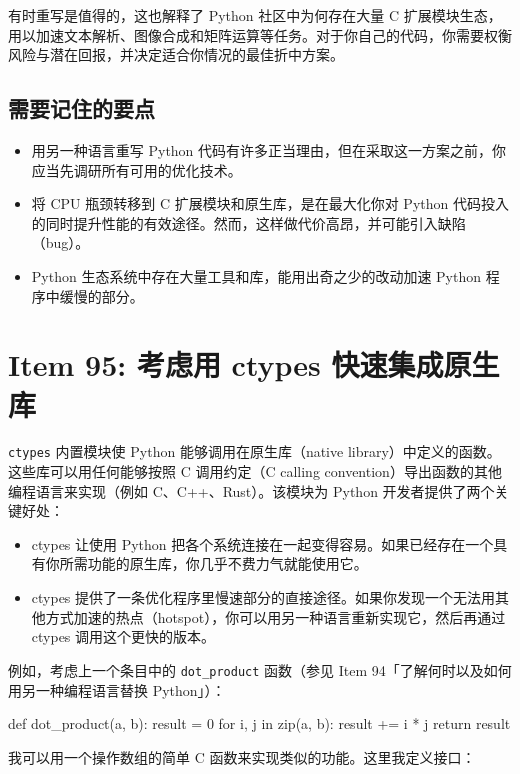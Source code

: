 有时重写是值得的，这也解释了 Python 社区中为何存在大量 C 扩展模块生态，用以加速文本解析、图像合成和矩阵运算等任务。对于你自己的代码，你需要权衡风险与潜在回报，并决定适合你情况的最佳折中方案。

\subsection{需要记住的要点}

\begin{itemize}
\item 用另一种语言重写 Python 代码有许多正当理由，但在采取这一方案之前，你应当先调研所有可用的优化技术。
\item 将 CPU 瓶颈转移到 C 扩展模块和原生库，是在最大化你对 Python 代码投入的同时提升性能的有效途径。然而，这样做代价高昂，并可能引入缺陷（bug）。
\item Python 生态系统中存在大量工具和库，能用出奇之少的改动加速 Python 程序中缓慢的部分。
\end{itemize}

\section{Item 95: 考虑用 ctypes 快速集成原生库}

\texttt{ctypes} 内置模块使 Python 能够调用在原生库（native library）中定义的函数。这些库可以用任何能够按照 C 调用约定（C calling convention）导出函数的其他编程语言来实现（例如 C、C++、Rust）。该模块为 Python 开发者提供了两个关键好处：

\begin{itemize}
\item ctypes 让使用 Python 把各个系统连接在一起变得容易。如果已经存在一个具有你所需功能的原生库，你几乎不费力气就能使用它。
\item ctypes 提供了一条优化程序里慢速部分的直接途径。如果你发现一个无法用其他方式加速的热点（hotspot），你可以用另一种语言重新实现它，然后再通过 ctypes 调用这个更快的版本。
\end{itemize}

例如，考虑上一个条目中的 \texttt{dot\_product} 函数（参见 Item 94「了解何时以及如何用另一种编程语言替换 Python」）：

\begin{codebox}[python]
def dot_product(a, b):
    result = 0
    for i, j in zip(a, b):
        result += i * j
    return result
\end{codebox}

我可以用一个操作数组的简单 C 函数来实现类似的功能。这里我定义接口：

